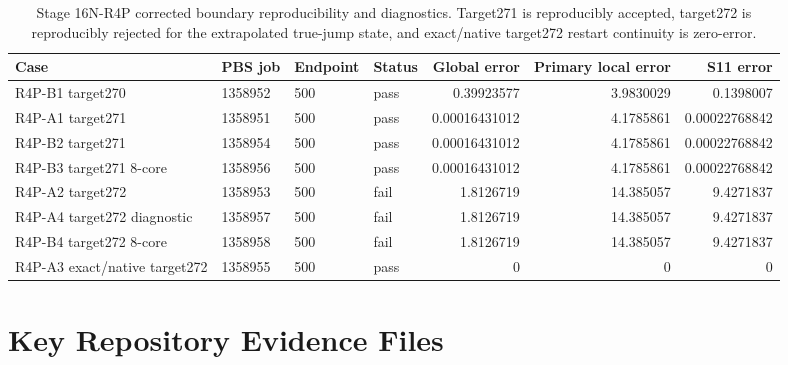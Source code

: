 \documentclass[11pt,a4paper]{article}
\begin{document}
\begin{table}[H]
\centering
\small
\begin{tabular}{llllrrr}
\toprule
Case & PBS job & Endpoint & Status & Global error & Primary local error & S11 error \\
\midrule
R4P-B1 target270 & 1358952 & 500 & pass & 0.39923577 & 3.9830029 & 0.1398007 \\
R4P-A1 target271 & 1358951 & 500 & pass & 0.00016431012 & 4.1785861 & 0.00022768842 \\
R4P-B2 target271 & 1358954 & 500 & pass & 0.00016431012 & 4.1785861 & 0.00022768842 \\
R4P-B3 target271 8-core & 1358956 & 500 & pass & 0.00016431012 & 4.1785861 & 0.00022768842 \\
R4P-A2 target272 & 1358953 & 500 & fail & 1.8126719 & 14.385057 & 9.4271837 \\
R4P-A4 target272 diagnostic & 1358957 & 500 & fail & 1.8126719 & 14.385057 & 9.4271837 \\
R4P-B4 target272 8-core & 1358958 & 500 & fail & 1.8126719 & 14.385057 & 9.4271837 \\
R4P-A3 exact/native target272 & 1358955 & 500 & pass & 0 & 0 & 0 \\
\bottomrule
\end{tabular}
\caption{Stage 16N-R4P corrected boundary reproducibility and diagnostics. Target271 is reproducibly accepted, target272 is reproducibly rejected for the extrapolated true-jump state, and exact/native target272 restart continuity is zero-error.}
\end{table}

\appendix
\section{Key Repository Evidence Files}
\end{document}
